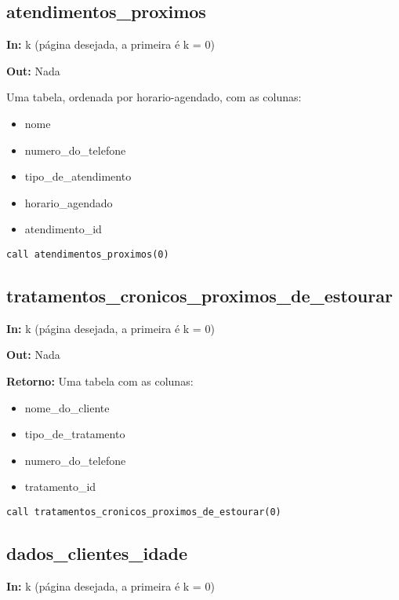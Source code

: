 \subsection{atendimentos\_proximos}

\textbf{In:} k (página desejada, a primeira é k = 0)

\textbf{Out:} Nada

Uma tabela, ordenada por horario-agendado, com as colunas:

\begin{itemize}
	\item nome
	\item numero\_do\_telefone
	\item tipo\_de\_atendimento
	\item horario\_agendado
	\item atendimento\_id
\end{itemize}

\begin{verbatim}
call atendimentos_proximos(0)
\end{verbatim}


\subsection{tratamentos\_cronicos\_proximos\_de\_estourar}

\textbf{In:} k (página desejada, a primeira é k = 0)

\textbf{Out:} Nada

\textbf{Retorno:} Uma tabela com as colunas:

\begin{itemize}
	\item nome\_do\_cliente
	\item tipo\_de\_tratamento
	\item numero\_do\_telefone
	\item tratamento\_id
\end{itemize}

\begin{verbatim}
call tratamentos_cronicos_proximos_de_estourar(0)
\end{verbatim}


\subsection{dados\_clientes\_idade}


\textbf{In:} k (página desejada, a primeira é k = 0)

